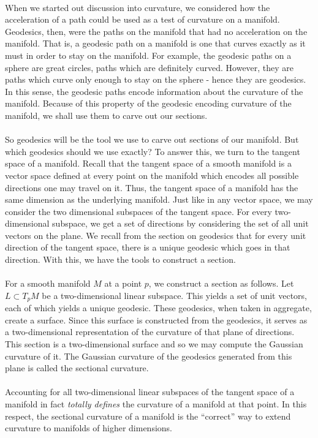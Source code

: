 \documentclass[]{article}
\newcommand\<{\ensuremath{\left\langle}}
\renewcommand\>{\ensuremath{\right\rangle}}
\theoremstyle{definition}
\theoremstyle{definition}
\begin{document}
	\\
	When we started out discussion into curvature, we considered how the acceleration of a path could be used as a test of curvature on a manifold. Geodesics, then, were the paths on the manifold that had no acceleration on the manifold. That is, a geodesic path on a manifold is one that curves exactly as it must in order to stay on the manifold. For example, the geodesic paths on a sphere are great circles, paths which are definitely curved. However, they are paths which curve only enough to stay on the sphere - hence they are geodesics. In this sense, the geodesic paths encode information about the curvature of the manifold. Because of this property of the geodesic encoding curvature of the manifold, we shall use them to carve out our sections.\\
	\\
	So geodesics will be the tool we use to carve out sections of our manifold. But which geodesics should we use exactly? To answer this, we turn to the tangent space of a manifold. Recall that the tangent space of a smooth manifold is a vector space defined at every point on the manifold which encodes all possible directions one may travel on it. Thus, the tangent space of a manifold has the same dimension as the underlying manifold. Just like in any vector space, we may consider the two dimensional subspaces of the tangent space. For every two-dimensional subspace, we get a set of directions by considering the set of all unit vectors on the plane. We recall from the section on geodesics that for every unit direction of the tangent space, there is a unique geodesic which goes in that direction. With this, we have the tools to construct a section.\\
	\\
	For a smooth manifold $M$ at a point $p$, we construct a section as follows. Let $L \subset T_pM$ be a two-dimensional linear subspace. This yields a set of unit vectors, each of which yields a unique geodesic. These geodesics, when taken in aggregate, create a surface. Since this surface is constructed from the geodesics, it serves as a two-dimensional representation of the curvature of that plane of directions. This section is a two-dimensional surface and so we may compute the Gaussian curvature of it. The Gaussian curvature of the geodesics generated from this plane is called the sectional curvature.\\
	\\
	Accounting for all two-dimensional linear subspaces of the tangent space of a manifold in fact \textit{totally defines} the curvature of a manifold at that point. In this respect, the sectional curvature of a manifold is the ``correct'' way to extend curvature to manifolds of higher dimensions.

\newpage


\nocite{*}
\end{document}
